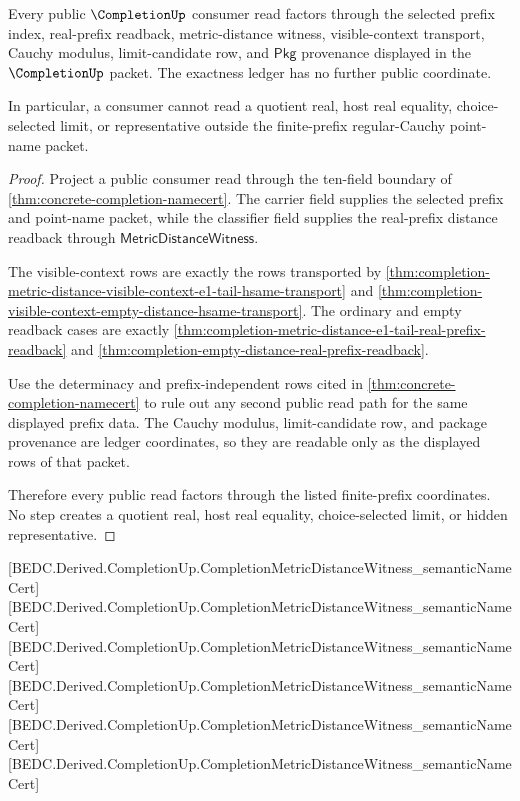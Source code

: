 \begin{theorem}\label{thm:completion-ledger-exactness-obligation}
Every public $\CompletionUp$ consumer read factors through the selected prefix index, real-prefix readback, metric-distance witness, visible-context transport, Cauchy modulus, limit-candidate row, and $\mathsf{Pkg}$ provenance displayed in the $\CompletionUp$ packet. The exactness ledger has no further public coordinate.

In particular, a consumer cannot read a quotient real, host real equality, choice-selected limit, or representative outside the finite-prefix regular-Cauchy point-name packet.
\end{theorem}
\begin{proof}
Project a public consumer read through the ten-field boundary of \autoref{thm:concrete-completion-namecert}. The carrier field supplies the selected prefix and point-name packet, while the classifier field supplies the real-prefix distance readback through $\mathsf{MetricDistanceWitness}$.

The visible-context rows are exactly the rows transported by \autoref{thm:completion-metric-distance-visible-context-e1-tail-hsame-transport} and \autoref{thm:completion-visible-context-empty-distance-hsame-transport}. The ordinary and empty readback cases are exactly \autoref{thm:completion-metric-distance-e1-tail-real-prefix-readback} and \autoref{thm:completion-empty-distance-real-prefix-readback}.

Use the determinacy and prefix-independent rows cited in \autoref{thm:concrete-completion-namecert} to rule out any second public read path for the same displayed prefix data. The Cauchy modulus, limit-candidate row, and package provenance are ledger coordinates, so they are readable only as the displayed rows of that packet.

Therefore every public read factors through the listed finite-prefix coordinates. No step creates a quotient real, host real equality, choice-selected limit, or hidden representative.
\end{proof}

[BEDC.Derived.CompletionUp.CompletionMetricDistanceWitness\_semanticNameCert]
[BEDC.Derived.CompletionUp.CompletionMetricDistanceWitness\_semanticNameCert]
[BEDC.Derived.CompletionUp.CompletionMetricDistanceWitness\_semanticNameCert]
[BEDC.Derived.CompletionUp.CompletionMetricDistanceWitness\_semanticNameCert]
[BEDC.Derived.CompletionUp.CompletionMetricDistanceWitness\_semanticNameCert]
[BEDC.Derived.CompletionUp.CompletionMetricDistanceWitness\_semanticNameCert]

